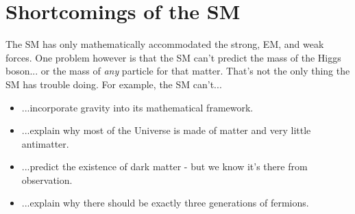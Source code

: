 






\section{Shortcomings of the SM}
\label{sec:shortcomings}
The SM has only mathematically accommodated the strong, EM, and weak forces.
One problem however is that the SM can't predict the mass of the Higgs boson... or the mass of \emph{any} particle for that matter.
That's not the only thing the SM has trouble doing. 
For example, the SM can't...
\begin{itemize}
    \item ...incorporate gravity into its mathematical framework.
    \item ...explain why most of the Universe is made of matter and very little antimatter.
    \item ...predict the existence of dark matter - but we know it's there from observation.
    \item ...explain why there should be exactly three generations of fermions. 
\end{itemize}

